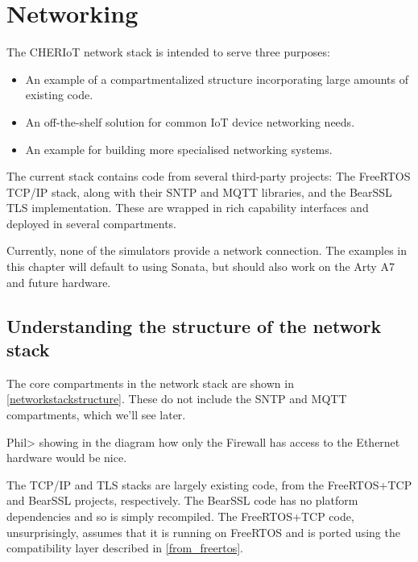 \chapter{Networking}

The CHERIoT network stack is intended to serve three purposes:

\begin{itemize}
	\item{An example of a compartmentalized structure incorporating large amounts of existing code.}
	\item{An off-the-shelf solution for common IoT device networking needs.}
	\item{An example for building more specialised networking systems.}
\end{itemize}

The current stack contains code from several third-party projects: The FreeRTOS TCP/IP stack, along with their SNTP and MQTT libraries, and the BearSSL TLS implementation.
These are wrapped in rich capability interfaces and deployed in several compartments.

\begin{note}
Currently, none of the simulators provide a network connection.
The examples in this chapter will default to using Sonata, but should also work on the Arty A7 and future hardware.
\end{note}

\section{Understanding the structure of the network stack}

The core compartments in the network stack are shown in \ref{networkstackstructure}.
These do not include the SNTP and MQTT compartments, which we'll see later.


Phil> showing in the diagram how only the Firewall has access to the Ethernet hardware would be nice.

The TCP/IP and TLS stacks are largely existing code, from the FreeRTOS+TCP and BearSSL projects, respectively.
The BearSSL code has no platform dependencies and so is simply recompiled.
The FreeRTOS+TCP code, unsurprisingly, assumes that it is running on FreeRTOS and is ported using the compatibility layer described in \ref{from_freertos}.

